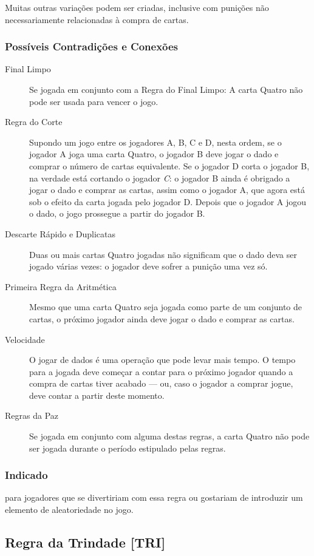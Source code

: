 Muitas outras variações podem ser criadas, inclusive com punições não necessariamente relacionadas à compra de cartas.

\subsubsection{Possíveis Contradições e Conexões}

\begin{description}
\item[Final Limpo]{Se jogada em conjunto com a Regra do Final Limpo: A carta Quatro não pode ser usada para vencer o jogo.}
\item[Regra do Corte]{Supondo um jogo entre os jogadores A, B, C e D, nesta ordem, se o jogador A joga uma carta Quatro, o jogador B deve jogar o dado e comprar o número de cartas equivalente. Se o jogador D corta o jogador B, na verdade está cortando o jogador \emph{C}: o jogador B ainda é obrigado a jogar o dado e comprar as cartas, assim como o jogador A, que agora está sob o efeito da carta jogada pelo jogador D. Depois que o jogador A jogou o dado, o jogo prossegue a partir do jogador B.}
\item[Descarte Rápido e Duplicatas]{Duas ou mais cartas Quatro jogadas não significam que o dado deva ser jogado várias vezes: o jogador deve sofrer a punição uma vez só.}
\item[Primeira Regra da Aritmética]{Mesmo que uma carta Quatro seja jogada como parte de um conjunto de cartas, o próximo jogador ainda deve jogar o dado e comprar as cartas.}
\item[Velocidade]{O jogar de dados é uma operação que pode levar mais tempo. O tempo para a jogada deve começar a contar para o próximo jogador quando a compra de cartas tiver acabado --- ou, caso o jogador a comprar jogue, deve contar a partir deste momento.}
\item[Regras da Paz]{Se jogada em conjunto com alguma destas regras, a carta Quatro não pode ser jogada durante o período estipulado pelas regras.}
\end{description}

\subsubsection{Indicado} 

para jogadores que se divertiriam com essa regra ou gostariam de introduzir um elemento de aleatoriedade no jogo.

\subsection{Regra da Trindade [TRI]}


